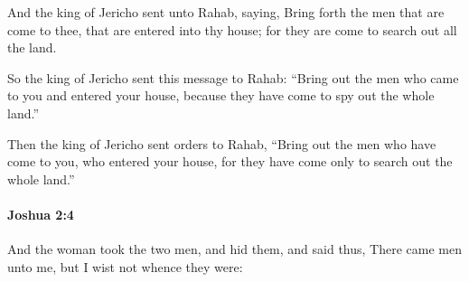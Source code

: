 			\begin{versebox}
					\item[BHS] 
					\item[ASV] And the king of Jericho sent unto Rahab, saying, Bring forth the men that are come to thee, that are entered into thy house; for they are come to search out all the land.
					\item[NIV] So the king of Jericho sent this message to Rahab: “Bring out the men who came to you and entered your house, because they have come to spy out the whole land.”
					\item[NRSV] Then the king of Jericho sent orders to Rahab, “Bring out the men who have come to you, who entered your house, for they have come only to search out the whole land.”
			\end{versebox}

		\paragraph{Joshua 2:4} %
			\label{JOSHUA-2-4}

			And the woman took the two men, and hid them, and said thus, There came men unto me, but I wist not whence they were:

